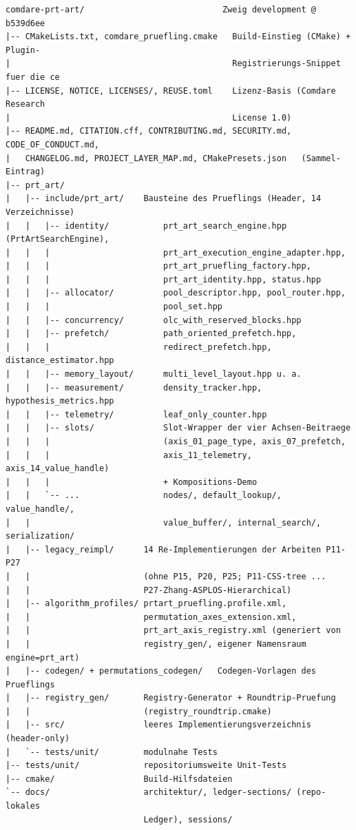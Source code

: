{\footnotesize
\begin{verbatim}
comdare-prt-art/                            Zweig development @ b539d6ee
|-- CMakeLists.txt, comdare_pruefling.cmake   Build-Einstieg (CMake) + Plugin-
|                                             Registrierungs-Snippet fuer die ce
|-- LICENSE, NOTICE, LICENSES/, REUSE.toml    Lizenz-Basis (Comdare Research
|                                             License 1.0)
|-- README.md, CITATION.cff, CONTRIBUTING.md, SECURITY.md, CODE_OF_CONDUCT.md,
|   CHANGELOG.md, PROJECT_LAYER_MAP.md, CMakePresets.json   (Sammel-Eintrag)
|-- prt_art/
|   |-- include/prt_art/    Bausteine des Prueflings (Header, 14 Verzeichnisse)
|   |   |-- identity/           prt_art_search_engine.hpp (PrtArtSearchEngine),
|   |   |                       prt_art_execution_engine_adapter.hpp,
|   |   |                       prt_art_pruefling_factory.hpp,
|   |   |                       prt_art_identity.hpp, status.hpp
|   |   |-- allocator/          pool_descriptor.hpp, pool_router.hpp,
|   |   |                       pool_set.hpp
|   |   |-- concurrency/        olc_with_reserved_blocks.hpp
|   |   |-- prefetch/           path_oriented_prefetch.hpp,
|   |   |                       redirect_prefetch.hpp, distance_estimator.hpp
|   |   |-- memory_layout/      multi_level_layout.hpp u. a.
|   |   |-- measurement/        density_tracker.hpp, hypothesis_metrics.hpp
|   |   |-- telemetry/          leaf_only_counter.hpp
|   |   |-- slots/              Slot-Wrapper der vier Achsen-Beitraege
|   |   |                       (axis_01_page_type, axis_07_prefetch,
|   |   |                       axis_11_telemetry, axis_14_value_handle)
|   |   |                       + Kompositions-Demo
|   |   `-- ...                 nodes/, default_lookup/, value_handle/,
|   |                           value_buffer/, internal_search/, serialization/
|   |-- legacy_reimpl/      14 Re-Implementierungen der Arbeiten P11-P27
|   |                       (ohne P15, P20, P25; P11-CSS-tree ...
|   |                       P27-Zhang-ASPLOS-Hierarchical)
|   |-- algorithm_profiles/ prtart_pruefling.profile.xml,
|   |                       permutation_axes_extension.xml,
|   |                       prt_art_axis_registry.xml (generiert von
|   |                       registry_gen/, eigener Namensraum engine=prt_art)
|   |-- codegen/ + permutations_codegen/   Codegen-Vorlagen des Prueflings
|   |-- registry_gen/       Registry-Generator + Roundtrip-Pruefung
|   |                       (registry_roundtrip.cmake)
|   |-- src/                leeres Implementierungsverzeichnis (header-only)
|   `-- tests/unit/         modulnahe Tests
|-- tests/unit/             repositoriumsweite Unit-Tests
|-- cmake/                  Build-Hilfsdateien
`-- docs/                   architektur/, ledger-sections/ (repo-lokales
                            Ledger), sessions/
\end{verbatim}
}

